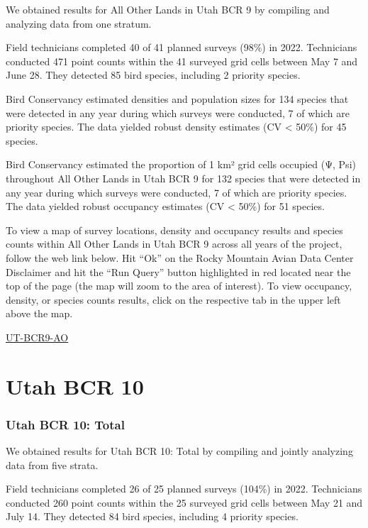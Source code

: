 \documentclass[
  letterpaper,
  DIV=11,
  numbers=noendperiod,
  oneside]{scrreprt}
\begin{document}
We obtained results for All Other Lands in Utah BCR 9 by compiling and
analyzing data from one stratum.

Field technicians completed 40 of 41 planned surveys (98\%) in 2022.
Technicians conducted 471 point counts within the 41 surveyed grid cells
between May 7 and June 28. They detected 85 bird species, including 2
priority species.

Bird Conservancy estimated densities and population sizes for 134
species that were detected in any year during which surveys were
conducted, 7 of which are priority species. The data yielded robust
density estimates (CV \textless{} 50\%) for 45 species.

Bird Conservancy estimated the proportion of 1 km² grid cells occupied
(Ψ, Psi) throughout All Other Lands in Utah BCR 9 for 132 species that
were detected in any year during which surveys were conducted, 7 of
which are priority species. The data yielded robust occupancy estimates
(CV \textless{} 50\%) for 51 species.

To view a map of survey locations, density and occupancy results and
species counts within All Other Lands in Utah BCR 9 across all years of
the project, follow the web link below. Hit ``Ok'' on the Rocky Mountain
Avian Data Center Disclaimer and hit the ``Run Query'' button
highlighted in red located near the top of the page (the map will zoom
to the area of interest). To view occupancy, density, or species counts
results, click on the respective tab in the upper left above the map.

\href{http://www.rmbo.org/new_site/adc/QueryWindow.aspx\#N4IgzgLgTghhCuBbEAuABCAqgFQLQCEBhAJQE5cBBAeXQoBs60qIALAUyjQBkYA7AEzAgAvkA===}{UT-BCR9-AO}

\hypertarget{utah-bcr-10}{%
\section{Utah BCR 10}\label{utah-bcr-10}}

\hypertarget{utah-bcr-10-total}{%
\subsubsection{Utah BCR 10: Total}\label{utah-bcr-10-total}}

We obtained results for Utah BCR 10: Total by compiling and jointly
analyzing data from five strata.

Field technicians completed 26 of 25 planned surveys (104\%) in 2022.
Technicians conducted 260 point counts within the 25 surveyed grid cells
between May 21 and July 14. They detected 84 bird species, including 4
priority species.
\end{document}
